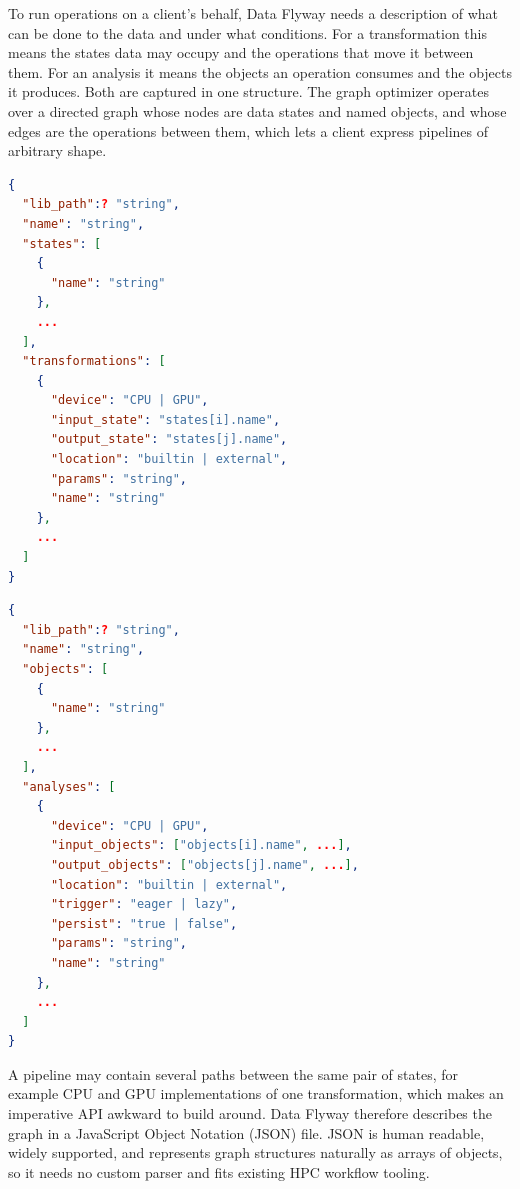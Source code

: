 To run operations on a client's behalf, Data Flyway needs a description of
what can be done to the data and under what conditions. For a
transformation this means the states data may occupy and the operations
that move it between them. For an analysis it means the objects an
operation consumes and the objects it produces. Both are captured in one
structure. The graph optimizer operates over a directed graph whose nodes
are data states and named objects, and whose edges are the operations
between them, which lets a client express pipelines of arbitrary shape.

\begin{lstlisting}[language=json, firstnumber=1,
  caption={JSON schema for the transformation graph. The ellipsis \texttt{...} indicates that one or more entries may be present. Fields marked ? are optional.},
  label={fig:transformation-schema},
  float=htbp
]
{
  "lib_path":? "string",
  "name": "string",
  "states": [
    {
      "name": "string"
    },
    ...
  ],
  "transformations": [
    {
      "device": "CPU | GPU",
      "input_state": "states[i].name",
      "output_state": "states[j].name",
      "location": "builtin | external",
      "params": "string",
      "name": "string"
    },
    ...
  ]
}
\end{lstlisting}

\begin{lstlisting}[language=json, firstnumber=1,
  caption={JSON schema for the analysis graph. Fields follow the same conventions as Listing~\ref{fig:transformation-schema}. The \texttt{input\_objects} and \texttt{output\_objects} fields are arrays rather than single names, which is what expresses fan-in and fan-out.},
  label={fig:analysis-schema},
  float=htbp
]
{
  "lib_path":? "string",
  "name": "string",
  "objects": [
    {
      "name": "string"
    },
    ...
  ],
  "analyses": [
    {
      "device": "CPU | GPU",
      "input_objects": ["objects[i].name", ...],
      "output_objects": ["objects[j].name", ...],
      "location": "builtin | external",
      "trigger": "eager | lazy",
      "persist": "true | false",
      "params": "string",
      "name": "string"
    },
    ...
  ]
}
\end{lstlisting}

A pipeline may contain several paths between the same pair of states, for
example CPU and GPU implementations of one transformation, which makes an
imperative API awkward to build around. Data Flyway therefore describes the
graph in a JavaScript Object Notation (JSON) file. JSON is human readable,
widely supported, and represents graph structures naturally as arrays of
objects, so it needs no custom parser and fits existing HPC workflow
tooling.

